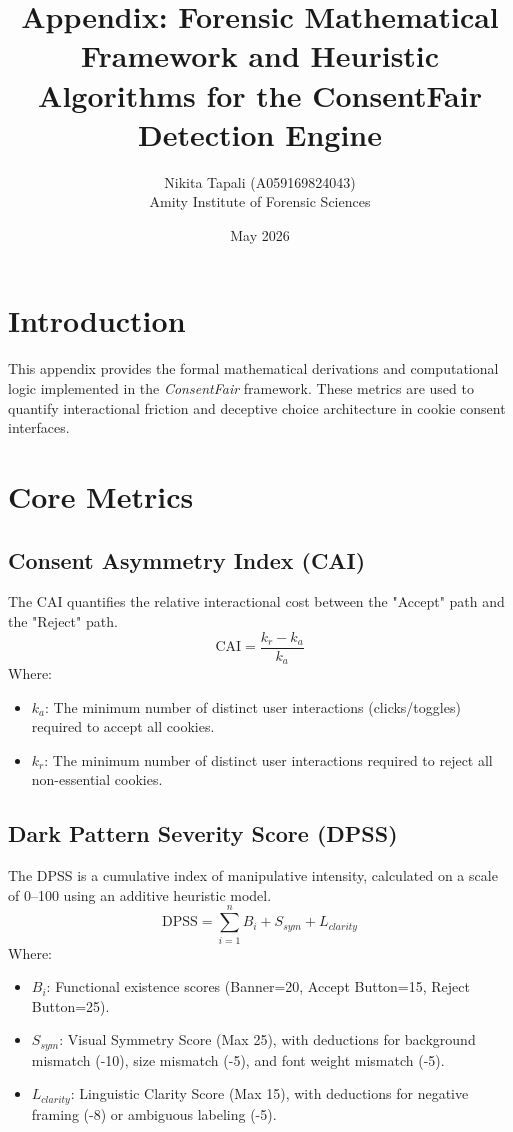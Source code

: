 \documentclass[12pt]{article}
\title{Appendix: Forensic Mathematical Framework and Heuristic Algorithms for the ConsentFair Detection Engine}
\author{Nikita Tapali (A059169824043) \\ Amity Institute of Forensic Sciences}
\date{May 2026}
\begin{document}
\maketitle

\section{Introduction}
This appendix provides the formal mathematical derivations and computational logic implemented in the \textit{ConsentFair} framework. These metrics are used to quantify interactional friction and deceptive choice architecture in cookie consent interfaces.

\section{Core Metrics}

\subsection{Consent Asymmetry Index (CAI)}
The CAI quantifies the relative interactional cost between the "Accept" path and the "Reject" path.
\begin{equation}
\text{CAI} = \frac{k_r - k_a}{k_a}
\end{equation}
Where:
\begin{itemize}
    \item $k_a$: The minimum number of distinct user interactions (clicks/toggles) required to accept all cookies.
    \item $k_r$: The minimum number of distinct user interactions required to reject all non-essential cookies.
\end{itemize}

\subsection{Dark Pattern Severity Score (DPSS)}
The DPSS is a cumulative index of manipulative intensity, calculated on a scale of 0--100 using an additive heuristic model.
\begin{equation}
\text{DPSS} = \sum_{i=1}^{n} B_i + S_{sym} + L_{clarity}
\end{equation}
Where:
\begin{itemize}
    \item $B_i$: Functional existence scores (Banner=20, Accept Button=15, Reject Button=25).
    \item $S_{sym}$: Visual Symmetry Score (Max 25), with deductions for background mismatch (-10), size mismatch (-5), and font weight mismatch (-5).
    \item $L_{clarity}$: Linguistic Clarity Score (Max 15), with deductions for negative framing (-8) or ambiguous labeling (-5).
\end{itemize}
\end{document}
